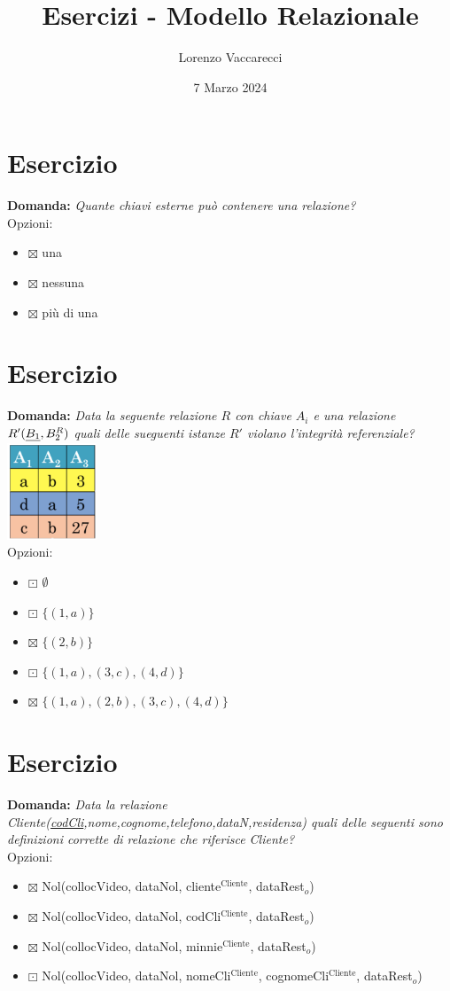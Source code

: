 \documentclass[12pt]{article}
\title{Esercizi - Modello Relazionale}
\author{Lorenzo Vaccarecci}
\date{7 Marzo 2024}
\begin{document}
\maketitle
\section{Esercizio}
\textbf{Domanda: }\textit{Quante chiavi esterne può contenere una relazione?}
\\Opzioni:
\begin{itemize}
    \item  $\boxtimes$ una
    \item  $\boxtimes$ nessuna
    \item  $\boxtimes$ più di una
\end{itemize}
\section{Esercizio}
\textbf{Domanda: }\textit{Data la seguente relazione $R$ con chiave $A_{i}$ e una relazione $R'(\uline{B_{1}},B_{2}^R)$ quali delle sueguenti istanze $R'$ violano l'integrità referenziale?}
\includegraphics[width=0.2\textwidth]{esercizio2.png}
\\Opzioni:
\begin{itemize}
    \item $\boxdot$ $\emptyset$
    \item $\boxdot$ $\{(1,a)\}$
    \item $\boxtimes$ $\{(2,b)\}$
    \item $\boxdot$ $\{(1,a),(3,c),(4,d)\}$
    \item $\boxtimes$ $\{(1,a),(2,b),(3,c),(4,d)\}$
\end{itemize}
\section{Esercizio}
\textbf{Domanda: }\textit{Data la relazione Cliente(\uline{codCli},nome,cognome,telefono,dataN,residenza) quali delle seguenti sono definizioni corrette di relazione che riferisce Cliente?}
\\Opzioni:
\begin{itemize}
    \item $\boxtimes$ Nol(collocVideo, dataNol, cliente$^\text{Cliente}$, dataRest$_{o}$)
    \item $\boxtimes$ Nol(collocVideo, dataNol, codCli$^\text{Cliente}$, dataRest$_{o}$)
    \item $\boxtimes$ Nol(collocVideo, dataNol, minnie$^\text{Cliente}$, dataRest$_{o}$)
    \item $\boxdot$ Nol(collocVideo, dataNol, nomeCli$^\text{Cliente}$, cognomeCli$^\text{Cliente}$, dataRest$_{o}$)
\end{itemize}
\end{document}
